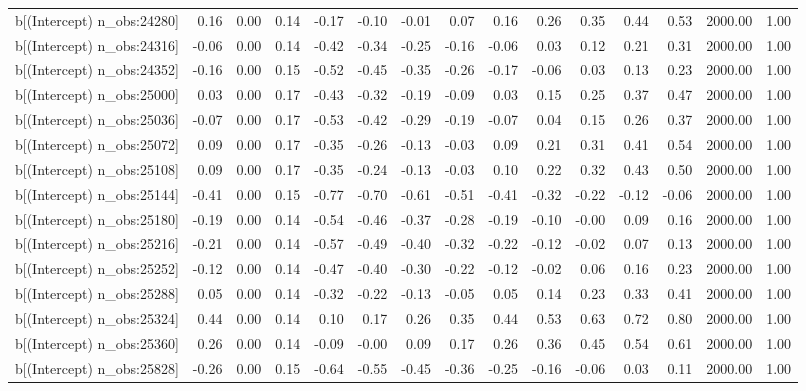 \begin{table}[ht]
\begin{tabular}{rrrrrrrrrrrrrrr}
  b[(Intercept) n\_obs:24280] & 0.16 & 0.00 & 0.14 & -0.17 & -0.10 & -0.01 & 0.07 & 0.16 & 0.26 & 0.35 & 0.44 & 0.53 & 2000.00 & 1.00 \\ 
  b[(Intercept) n\_obs:24316] & -0.06 & 0.00 & 0.14 & -0.42 & -0.34 & -0.25 & -0.16 & -0.06 & 0.03 & 0.12 & 0.21 & 0.31 & 2000.00 & 1.00 \\ 
  b[(Intercept) n\_obs:24352] & -0.16 & 0.00 & 0.15 & -0.52 & -0.45 & -0.35 & -0.26 & -0.17 & -0.06 & 0.03 & 0.13 & 0.23 & 2000.00 & 1.00 \\ 
  b[(Intercept) n\_obs:25000] & 0.03 & 0.00 & 0.17 & -0.43 & -0.32 & -0.19 & -0.09 & 0.03 & 0.15 & 0.25 & 0.37 & 0.47 & 2000.00 & 1.00 \\ 
  b[(Intercept) n\_obs:25036] & -0.07 & 0.00 & 0.17 & -0.53 & -0.42 & -0.29 & -0.19 & -0.07 & 0.04 & 0.15 & 0.26 & 0.37 & 2000.00 & 1.00 \\ 
  b[(Intercept) n\_obs:25072] & 0.09 & 0.00 & 0.17 & -0.35 & -0.26 & -0.13 & -0.03 & 0.09 & 0.21 & 0.31 & 0.41 & 0.54 & 2000.00 & 1.00 \\ 
  b[(Intercept) n\_obs:25108] & 0.09 & 0.00 & 0.17 & -0.35 & -0.24 & -0.13 & -0.03 & 0.10 & 0.22 & 0.32 & 0.43 & 0.50 & 2000.00 & 1.00 \\ 
  b[(Intercept) n\_obs:25144] & -0.41 & 0.00 & 0.15 & -0.77 & -0.70 & -0.61 & -0.51 & -0.41 & -0.32 & -0.22 & -0.12 & -0.06 & 2000.00 & 1.00 \\ 
  b[(Intercept) n\_obs:25180] & -0.19 & 0.00 & 0.14 & -0.54 & -0.46 & -0.37 & -0.28 & -0.19 & -0.10 & -0.00 & 0.09 & 0.16 & 2000.00 & 1.00 \\ 
  b[(Intercept) n\_obs:25216] & -0.21 & 0.00 & 0.14 & -0.57 & -0.49 & -0.40 & -0.32 & -0.22 & -0.12 & -0.02 & 0.07 & 0.13 & 2000.00 & 1.00 \\ 
  b[(Intercept) n\_obs:25252] & -0.12 & 0.00 & 0.14 & -0.47 & -0.40 & -0.30 & -0.22 & -0.12 & -0.02 & 0.06 & 0.16 & 0.23 & 2000.00 & 1.00 \\ 
  b[(Intercept) n\_obs:25288] & 0.05 & 0.00 & 0.14 & -0.32 & -0.22 & -0.13 & -0.05 & 0.05 & 0.14 & 0.23 & 0.33 & 0.41 & 2000.00 & 1.00 \\ 
  b[(Intercept) n\_obs:25324] & 0.44 & 0.00 & 0.14 & 0.10 & 0.17 & 0.26 & 0.35 & 0.44 & 0.53 & 0.63 & 0.72 & 0.80 & 2000.00 & 1.00 \\ 
  b[(Intercept) n\_obs:25360] & 0.26 & 0.00 & 0.14 & -0.09 & -0.00 & 0.09 & 0.17 & 0.26 & 0.36 & 0.45 & 0.54 & 0.61 & 2000.00 & 1.00 \\ 
  b[(Intercept) n\_obs:25828] & -0.26 & 0.00 & 0.15 & -0.64 & -0.55 & -0.45 & -0.36 & -0.25 & -0.16 & -0.06 & 0.03 & 0.11 & 2000.00 & 1.00 \\ 

\end{tabular}
\end{table}
